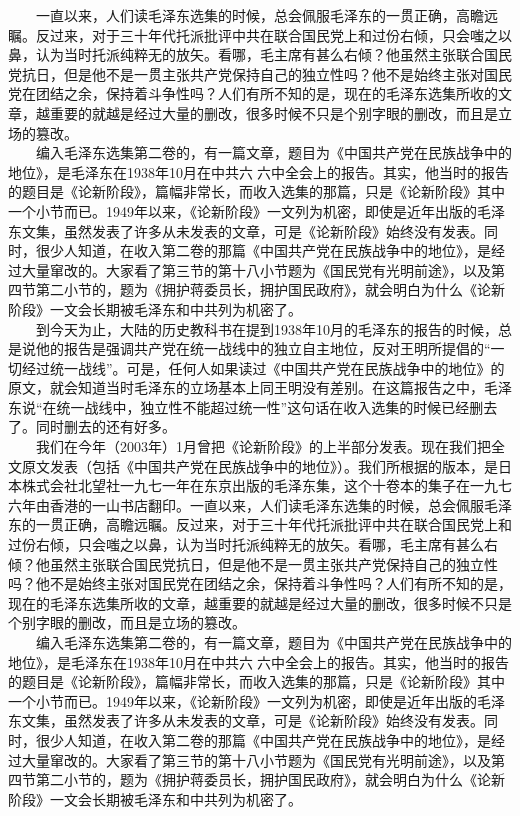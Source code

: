 \documentclass[cn,11pt,chinese]{elegantbook}
\begin{document}
\begin{introduction}
\item 　　一直以来，人们读毛泽东选集的时候，总会佩服毛泽东的一贯正确，高瞻远瞩。反过来，对于三十年代托派批评中共在联合国民党上和过份右倾，只会嗤之以鼻，认为当时托派纯粹无的放矢。看哪，毛主席有甚么右倾？他虽然主张联合国民党抗日，但是他不是一贯主张共产党保持自己的独立性吗？他不是始终主张对国民党在团结之余，保持着斗争性吗？人们有所不知的是，现在的毛泽东选集所收的文章，越重要的就越是经过大量的删改，很多时候不只是个别字眼的删改，而且是立场的篡改。\\
　　编入毛泽东选集第二卷的，有一篇文章，题目为《中国共产党在民族战争中的地位》，是毛泽东在1938年10月在中共六六中全会上的报告。其实，他当时的报告的题目是《论新阶段》，篇幅非常长，而收入选集的那篇，只是《论新阶段》其中一个小节而已。1949年以来，《论新阶段》一文列为机密，即使是近年出版的毛泽东文集，虽然发表了许多从未发表的文章，可是《论新阶段》始终没有发表。同时，很少人知道，在收入第二卷的那篇《中国共产党在民族战争中的地位》，是经过大量窜改的。大家看了第三节的第十八小节题为《国民党有光明前途》，以及第四节第二小节的，题为《拥护蒋委员长，拥护国民政府》，就会明白为什么《论新阶段》一文会长期被毛泽东和中共列为机密了。\\
　　到今天为止，大陆的历史教科书在提到1938年10月的毛泽东的报告的时候，总是说他的报告是强调共产党在统一战线中的独立自主地位，反对王明所提倡的“一切经过统一战线”。可是，任何人如果读过《中国共产党在民族战争中的地位》的原文，就会知道当时毛泽东的立场基本上同王明没有差别。在这篇报告之中，毛泽东说“在统一战线中，独立性不能超过统一性”这句话在收入选集的时候已经删去了。同时删去的还有好多。\\
　　我们在今年（2003年）1月曾把《论新阶段》的上半部分发表。现在我们把全文原文发表（包括《中国共产党在民族战争中的地位》）。我们所根据的版本，是日本株式会社北望社一九七一年在东京出版的毛泽东集，这个十卷本的集子在一九七六年由香港的一山书店翻印。一直以来，人们读毛泽东选集的时候，总会佩服毛泽东的一贯正确，高瞻远瞩。反过来，对于三十年代托派批评中共在联合国民党上和过份右倾，只会嗤之以鼻，认为当时托派纯粹无的放矢。看哪，毛主席有甚么右倾？他虽然主张联合国民党抗日，但是他不是一贯主张共产党保持自己的独立性吗？他不是始终主张对国民党在团结之余，保持着斗争性吗？人们有所不知的是，现在的毛泽东选集所收的文章，越重要的就越是经过大量的删改，很多时候不只是个别字眼的删改，而且是立场的篡改。\\
　　编入毛泽东选集第二卷的，有一篇文章，题目为《中国共产党在民族战争中的地位》，是毛泽东在1938年10月在中共六六中全会上的报告。其实，他当时的报告的题目是《论新阶段》，篇幅非常长，而收入选集的那篇，只是《论新阶段》其中一个小节而已。1949年以来，《论新阶段》一文列为机密，即使是近年出版的毛泽东文集，虽然发表了许多从未发表的文章，可是《论新阶段》始终没有发表。同时，很少人知道，在收入第二卷的那篇《中国共产党在民族战争中的地位》，是经过大量窜改的。大家看了第三节的第十八小节题为《国民党有光明前途》，以及第四节第二小节的，题为《拥护蒋委员长，拥护国民政府》，就会明白为什么《论新阶段》一文会长期被毛泽东和中共列为机密了。\\

\end{introduction}
\end{document}
